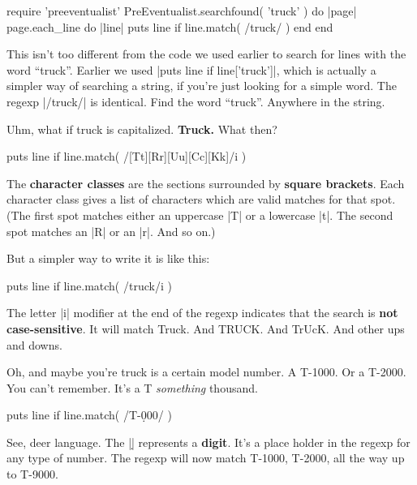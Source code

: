 \documentclass[12pt,twoside]{report}
\begin{document}
\begin{rubycode}

 require 'preeventualist'
 PreEventualist.searchfound( 'truck' ) do |page|
   page.each_line do |line|
     puts line if line.match( /truck/ )
   end
 end

\end{rubycode}


This isn't too different from the code we used earlier to search for
lines with the word ``truck''.  Earlier we used
\rubyinline|puts line if line['truck']|, which is
actually a simpler way of searching a string, if you're just looking
for a simple word.  The regexp \rubyinline|/truck/| is
identical.  Find the word ``truck''.  Anywhere in the string.


Uhm, what if truck is capitalized.  {\bf Truck.}  What then?


\begin{rubycode}

 puts line if line.match( /[Tt][Rr][Uu][Cc][Kk]/i )

\end{rubycode}


The {\bf character classes} are the sections surrounded by {\bf square
  brackets}.  Each character class gives a list of characters which
are valid matches for that spot.  (The first spot matches either an
uppercase \rubyinline|T| or a lowercase
\rubyinline|t|.  The second spot matches an
\rubyinline|R| or an \rubyinline|r|.
And so on.)

But a simpler way to write it is like this:


\begin{rubycode}

 puts line if line.match( /truck/i )

\end{rubycode}


The letter \rubyinline|i| modifier at the end of the
regexp indicates that the search is {\bf not case-sensitive}.  It will
match Truck.  And TRUCK.  And TrUcK.  And other ups and downs.

Oh, and maybe you're truck is a certain model number.  A T-1000.  Or a
T-2000.  You can't remember.  It's a T {\em something} thousand.


\begin{rubycode}

 puts line if line.match( /T-\d000/ )

\end{rubycode}


See, deer language.  The \rubyinline|\d| represents a
{\bf digit}.  It's a place holder in the regexp for any type of
number.  The regexp will now match T-1000, T-2000, all the way up to
T-9000.
\end{document}
